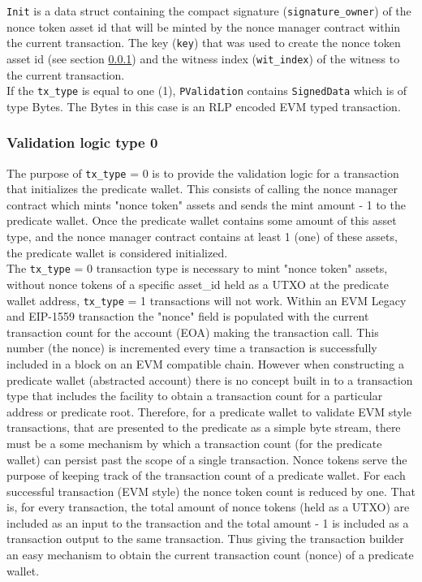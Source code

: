 \texttt{Init} is a data struct containing the compact signature (\texttt{signature\_owner}) of the nonce token asset id that will
be minted by the nonce manager contract within the current transaction. The key (\texttt{key}) that was used to create the nonce
token asset id (see section \ref{sec:asset_id}) and the witness index (\texttt{wit\_index}) of the witness to the current transaction.\\


If the \texttt{tx\_type} is equal to one (1), \texttt{PValidation} contains \texttt{SignedData} which is of type Bytes. The Bytes
in this case is an RLP encoded EVM typed transaction.



\subsubsection{Validation logic type 0}
\label{sec:asset_id}

The purpose of \texttt{tx\_type} = 0 is to provide the validation logic for a transaction that initializes the predicate wallet. This consists of calling
the nonce manager contract which mints "nonce token" assets and sends the mint amount - 1 to the predicate wallet. Once the predicate wallet contains some
amount of this asset type, and the nonce manager contract contains at least 1 (one) of these assets, the predicate wallet is considered initialized.\\

The \texttt{tx\_type} = 0 transaction type is necessary to mint "nonce token" assets, without nonce tokens of a specific asset\_id held as a UTXO at the predicate
wallet address, \texttt{tx\_type} = 1 transactions will not work. Within an EVM Legacy and EIP-1559 transaction the "nonce" field is populated with
the current transaction count for the account (EOA) making the transaction call. This number (the nonce) is incremented every time a
transaction is successfully included in a block on an EVM compatible chain. However when constructing a predicate wallet (abstracted account) there is
no concept built in to a transaction type that includes the facility to obtain a transaction count for a particular address or predicate root. Therefore,
for a predicate wallet to validate EVM style transactions, that are presented to the predicate as a simple byte stream, there must be a some mechanism by
which a transaction count (for the predicate wallet) can persist past the scope of a single transaction. Nonce tokens serve the purpose of keeping track
of the transaction count of a predicate wallet. For each
successful transaction (EVM style) the nonce token count is reduced by one. That is, for every transaction, the total amount of nonce tokens (held as
a UTXO) are included as an input to the transaction and the total amount - 1 is included as a transaction output to the same transaction. Thus
giving the transaction builder an easy mechanism to obtain the current transaction count (nonce) of a predicate wallet.\\



